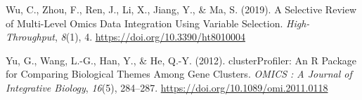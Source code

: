 \documentclass[a4paper, nobind]{templates/ociamthesis}
\newlength{\cslhangindent}
\newenvironment{CSLReferences}[2] %
 {%
  \setlength{\parindent}{0pt}
  \ifodd #1
  \let\oldpar\par
  \def\par{\hangindent=\cslhangindent\oldpar}
  \fi
  \setlength{\parskip}{1mm}
  \setlength{\baselineskip}{6mm}
 }%
 {}
\begin{document}
\begin{CSLReferences}{1}{0}
\leavevmode{}%
Wu, C., Zhou, F., Ren, J., Li, X., Jiang, Y., \& Ma, S. (2019). A {Selective} {Review} of {Multi}-{Level} {Omics} {Data} {Integration} {Using} {Variable} {Selection}. \emph{High-Throughput}, \emph{8}(1), 4. \url{https://doi.org/10.3390/ht8010004}

\leavevmode{}%
Yu, G., Wang, L.-G., Han, Y., \& He, Q.-Y. (2012). {clusterProfiler}: An {R} {Package} for {Comparing} {Biological} {Themes} {Among} {Gene} {Clusters}. \emph{OMICS : A Journal of Integrative Biology}, \emph{16}(5), 284--287. \url{https://doi.org/10.1089/omi.2011.0118}

\end{CSLReferences}

\end{document}
